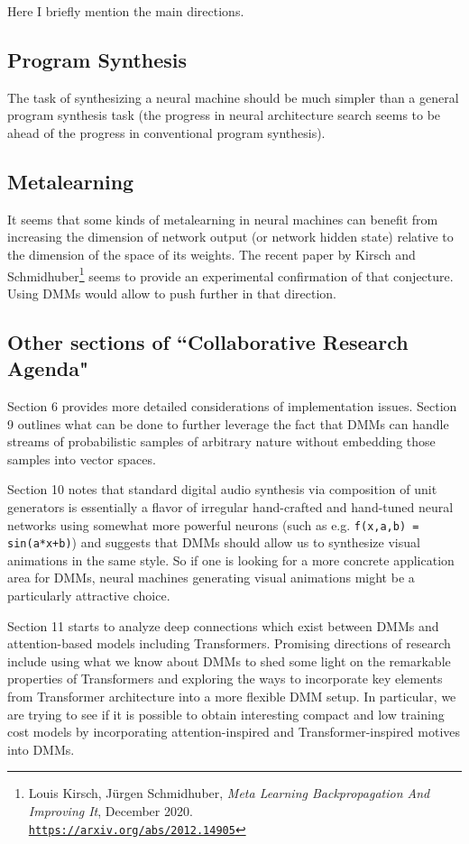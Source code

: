 \documentclass{article}
\begin{document}
Here I briefly mention the main directions.

\subsection{Program Synthesis}

The task of synthesizing a neural machine should be much simpler than a general program synthesis task
(the progress in neural architecture search seems to be ahead of the progress in conventional program synthesis).

\subsection{Metalearning}

It seems that some kinds of metalearning in neural machines can benefit from increasing the dimension of
network output (or network hidden state) relative to the dimension of the space of its weights. The recent
paper by Kirsch and Schmidhuber\footnote{Louis Kirsch, Jürgen Schmidhuber,
{\em Meta Learning Backpropagation And Improving It}, December 2020.\\
\href{https://arxiv.org/abs/2012.14905}{\tt https://arxiv.org/abs/2012.14905}} seems to provide
an experimental confirmation of that conjecture. Using DMMs would allow to push further in that direction. 

\subsection{Other sections of ``Collaborative Research Agenda"}

Section 6 provides more detailed considerations of implementation issues. Section 9 outlines
what can be done to further leverage the fact that DMMs can handle streams of probabilistic
samples of arbitrary nature without embedding those samples into vector spaces. 

Section 10 notes that standard digital audio synthesis via composition of unit generators is essentially
a flavor of irregular hand-crafted and hand-tuned neural networks using somewhat more powerful
neurons (such as e.g. {\tt f(x,a,b) = sin(a*x+b)}) and suggests that DMMs should allow us to synthesize visual animations in the same style.
So if one is looking for a more concrete application area for DMMs, neural machines generating
visual animations might be a particularly attractive choice.

Section 11 starts to analyze deep connections which exist between DMMs and attention-based models including
Transformers. Promising directions of research include using what we know about DMMs to
shed some light on the remarkable properties of Transformers and exploring the ways to incorporate key elements from Transformer architecture into a more flexible DMM setup. In particular, we are trying to see
if it is possible to obtain interesting compact and low training cost models by 
incorporating attention-inspired and Transformer-inspired motives into DMMs.
\end{document}
